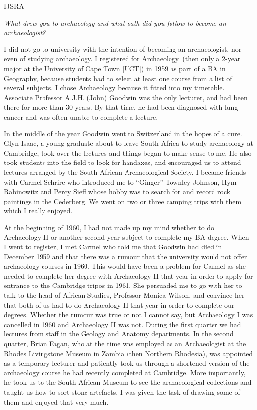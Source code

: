 \begin{labeling}{IJSRA}	
\item[IJSRA (International Journal of Student Research in Archaeology)] \emph{What drew you to archaeology and what path did you follow to become an archaeologist?}
	
\item[Janette Deacon (JD)]
I did not go to university with the intention of becoming an archaeologist, nor even of studying archaeology. I registered for Archaeology (then only a 2-year major at the University of Cape Town [UCT]) in 1959 as part of a BA in Geography, because students had to select at least one course from a list of several subjects. I chose Archaeology because it fitted into my timetable. Associate Professor A.J.H. (John) Goodwin was the only lecturer, and had been there for more than 30 years. By that time, he had been diagnosed with lung cancer and was often unable to complete a lecture.

In the middle of the year Goodwin went to Switzerland in the hopes of a cure. Glyn Isaac, a young graduate about to leave South Africa to study archaeology at Cambridge, took over the lectures and things began to make sense to me. He also took students into the field to look for handaxes, and encouraged us to attend lectures arranged by the South African Archaeological Society. I became friends with Carmel Schrire who introduced me to “Ginger” Townley Johnson, Hym Rabinowitz and Percy Sieff whose hobby was to search for and record rock paintings in the Cederberg. We went on two or three camping trips with them which I really enjoyed.

At the beginning of 1960, I had not made up my mind whether to do Archaeology II or another second year subject to complete my BA degree. When I went to register, I met Carmel who told me that Goodwin had died in December 1959 and that there was a rumour that the university would not offer archaeology courses in 1960. This would have been a problem for Carmel as she needed to complete her degree with Archaeology II that year in order to apply for entrance to the Cambridge tripos in 1961. She persuaded me to go with her to talk to the head of African Studies, Professor Monica Wilson, and convince her that both of us had to do Archaeology II that year in order to complete our degrees. Whether the rumour was true or not I cannot say, but Archaeology I was cancelled in 1960 and Archaeology II was not. During the first quarter we had lectures from staff in the Geology and Anatomy departments. In the second quarter, Brian Fagan, who at the time was employed as an Archaeologist at the Rhodes Livingstone Museum in Zambia (then Northern Rhodesia), was appointed as a temporary lecturer and patiently took us through a shortened version of the archaeology course he had recently completed at Cambridge. More importantly, he took us to the South African Museum to see the archaeological collections and taught us how to sort stone artefacts. I was given the task of drawing some of them and enjoyed that very much.


\end{labeling}
